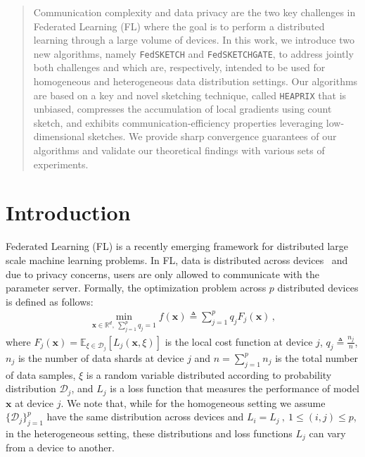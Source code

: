 \documentclass{article}
\newcommand{\todo}[1]{\textcolor{red}{ToDo:~#1}}
\begin{document}
\begin{abstract}
Communication complexity and data privacy are the two key challenges in Federated Learning (FL) where the goal is to perform a distributed learning through a large volume of devices. In this work, we introduce two new algorithms, namely \texttt{FedSKETCH} and \texttt{FedSKETCHGATE}, to address jointly both challenges and which are, respectively, intended to be used for homogeneous and heterogeneous data distribution settings. Our algorithms are based on a key and novel sketching technique, called \texttt{HEAPRIX} that is unbiased, compresses the accumulation of local gradients using count sketch, and exhibits communication-efficiency properties leveraging low-dimensional sketches. We provide sharp convergence guarantees of our algorithms and validate our theoretical findings with various sets of experiments. 
\end{abstract}
\vspace{-0.2in}
\section{Introduction}
\vspace{-0.05in}
Federated Learning (FL) is a recently emerging framework for distributed large scale machine learning problems.
In FL, data is distributed across devices~\citep{mcmahan2016communication,konevcny2016federated} and due to privacy concerns, users are only allowed to communicate with the parameter server.
Formally, the optimization problem across $p$ distributed devices is defined as follows:
\begin{align}\label{eq:main}
   \min_{\boldsymbol{x}\in \mathbb{R}^{d},\: \sum_{j=1}^pq_j=1} f(\boldsymbol{x})\triangleq \sum_{j=1}^{p}q_jF_j(\boldsymbol{x}) \, , 
\end{align}
where $F_j(\boldsymbol{x})=\mathbb{E}_{\xi\in\mathcal{D}_j}\left[L_j\left(\boldsymbol{x},\xi\right)\right]$ is the local cost function at device $j$, $q_j\triangleq\frac{n_j}{n}$, $n_j$ is the number of data shards at device $j$ and $n=\sum_{j=1}^pn_j$ is the total number of data samples,
$\xi$ is a random variable distributed according to probability distribution $\mathcal{D}_j$, and $L_j$ is a loss function that measures the performance of model $\boldsymbol{x}$ at device $j$. 
We note that, while for the homogeneous setting we assume $\{\mathcal{D}_j\}_{j=1}^p$ have the same distribution across devices and $L_i=L_j \ , \ 1 \leq (i,j) \leq p$, in the heterogeneous setting, these distributions and loss functions $L_j$ can vary from a device to another. 
\end{document}
